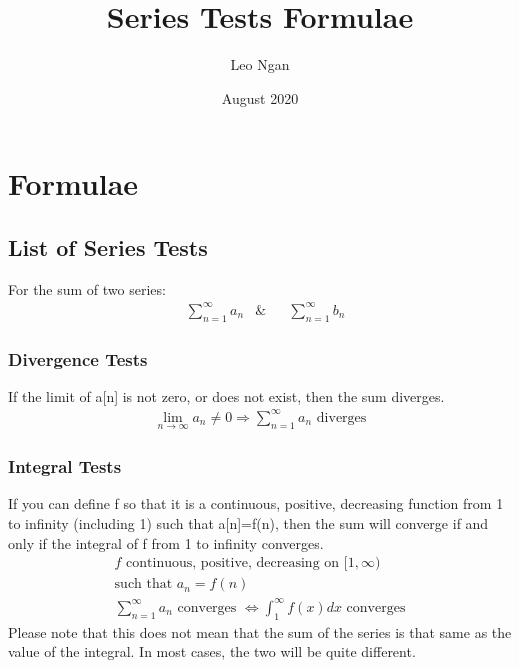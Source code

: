 \documentclass{article}
\title{Series Tests Formulae}
\author{Leo Ngan}
\date{August 2020}
\begin{document}
\maketitle\pagebreak

\tableofcontents\pagebreak

\section{Formulae}
    \subsection{List of Series Tests}
    For the sum of two series:
    \begin{align*}
        &\sum^{\infty}_{n=1} a_n  &\&&  &\sum^{\infty}_{n=1} b_n
    \end{align*}
        \subsubsection{Divergence Tests}
        If the limit of a[n] is not zero, or does not exist, then the sum diverges.
            \begin{align*}
                \lim_{n\rightarrow \infty} a_n \neq 0 \Rightarrow \sum^{\infty}_{n=1} a_n \text{ diverges}
            \end{align*}
            
        \subsubsection{Integral Tests}
        If you can define f so that it is a continuous, positive, decreasing function from 1 to infinity (including 1) such that a[n]=f(n), then the sum will converge if and only if the integral of f from 1 to infinity converges.
            \begin{gather*}
                f \text{ continuous, positive, decreasing on } [1,\infty)\\[6pt]
                \text{such that } a_n = f(n)\\[6pt]
                \sum^{\infty}_{n=1} a_n \text{ converges } \Longleftrightarrow \int^{\infty}_{1} f(x) dx \text{ converges}
            \end{gather*}
        Please note that this does not mean that the sum of the series is that same as the value of the integral. In most cases, the two will be quite different.
        
\end{document}
